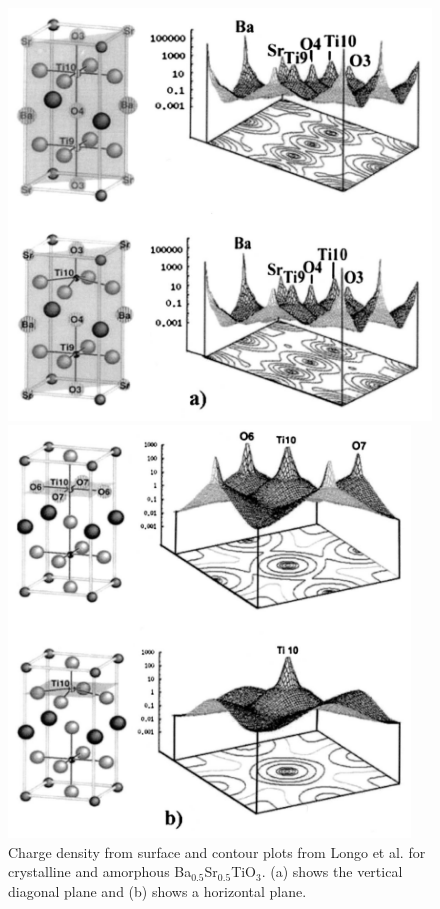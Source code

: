 \documentclass[3p,review,12pt]{elsarticle}
\begin{document}
\begin{figure}[H]
	\centering
	\begin{minipage}[b]{0.45\textwidth}
		\includegraphics[width=\textwidth]{longoA}
	\end{minipage}
	\hfill
	\begin{minipage}[b]{0.45\textwidth}
		\includegraphics[width=0.95\textwidth]{longoB}
		\centering
	\end{minipage}
	\caption{Charge density from surface and contour plots from Longo et al. \cite{Longo2004} for crystalline and amorphous  Ba$_{0.5}$Sr$_{0.5}$TiO$_{3}$. (a) shows the vertical diagonal plane and (b) shows a horizontal plane.}
\end{figure}
\end{document}
